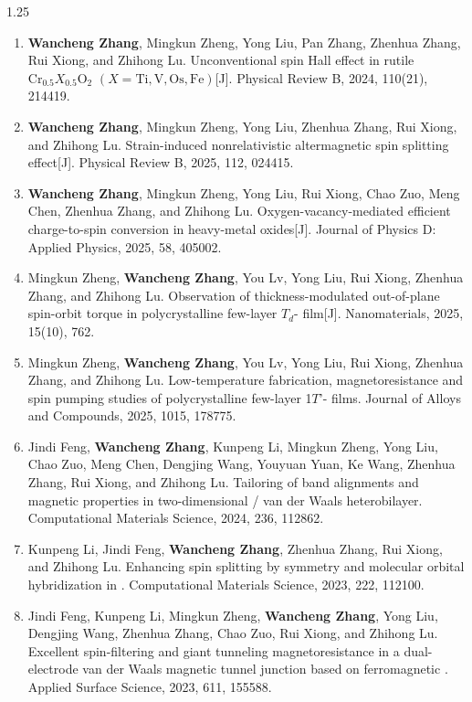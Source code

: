 \begin{publications}
\begin{spacing}{1.25}
\begin{enumerate}
\item \textbf{Wancheng Zhang}, Mingkun Zheng, Yong Liu, Pan Zhang, Zhenhua Zhang, Rui Xiong, and Zhihong Lu. Unconventional spin Hall effect in rutile ${\mathrm{Cr}}_{0.5}{X}_{0.5}{\mathrm{O}}_{2}$ $(X=\mathrm{Ti},\mathrm{V},\mathrm{Os},\mathrm{Fe})$[J]. Physical Review B, 2024, 110(21), 214419.
\item \textbf{Wancheng Zhang}, Mingkun Zheng, Yong Liu, Zhenhua Zhang, Rui Xiong, and Zhihong Lu. Strain-induced nonrelativistic altermagnetic spin splitting effect[J]. Physical Review B, 2025, 112, 024415.
\item \textbf{Wancheng Zhang}, Mingkun Zheng, Yong Liu, Rui Xiong, Chao Zuo, Meng Chen, Zhenhua Zhang, and Zhihong Lu. Oxygen-vacancy-mediated efficient charge-to-spin conversion in heavy-metal oxides[J]. Journal of Physics D: Applied Physics, 2025, 58, 405002.
\item Mingkun Zheng, \textbf{Wancheng Zhang}, You Lv, Yong Liu, Rui Xiong, Zhenhua Zhang, and Zhihong Lu. Observation of thickness-modulated out-of-plane spin-orbit torque in polycrystalline few-layer $T_d$- film[J]. Nanomaterials, 2025, 15(10), 762.
\item Mingkun Zheng, \textbf{Wancheng Zhang}, You Lv, Yong Liu, Rui Xiong, Zhenhua Zhang, and Zhihong Lu. Low-temperature fabrication, magnetoresistance and spin pumping studies of polycrystalline few-layer 1$T$'- films. Journal of Alloys and Compounds, 2025, 1015, 178775.
\item Jindi Feng, \textbf{Wancheng Zhang}, Kunpeng Li, Mingkun Zheng, Yong Liu, Chao Zuo, Meng Chen, Dengjing Wang, Youyuan Yuan, Ke Wang, Zhenhua Zhang, Rui Xiong, and Zhihong Lu. Tailoring of band alignments and magnetic properties in two-dimensional / van der Waals heterobilayer. Computational Materials Science, 2024, 236, 112862.
\item Kunpeng Li, Jindi Feng, \textbf{Wancheng Zhang}, Zhenhua Zhang, Rui Xiong, and Zhihong Lu. Enhancing spin splitting by symmetry and molecular orbital hybridization in . Computational Materials Science, 2023, 222, 112100.
\item Jindi Feng, Kunpeng Li, Mingkun Zheng, \textbf{Wancheng Zhang}, Yong Liu, Dengjing Wang, Zhenhua Zhang, Chao Zuo, Rui Xiong, and Zhihong Lu. Excellent spin-filtering and giant tunneling magnetoresistance in a dual-electrode van der Waals magnetic tunnel junction based on ferromagnetic . Applied Surface Science, 2023, 611, 155588.
\end{enumerate}
\end{spacing}


\end{publications}
